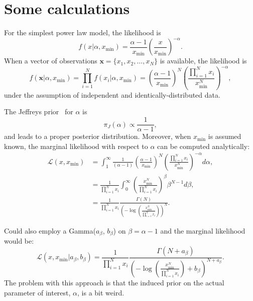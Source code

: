 \documentclass[a4paper, notitlepage, 10pt]{article}
\begin{document}
\section{Some calculations}
For the simplest power law model, the likelihood is
  $$ f(x | \alpha, x_{\min}) = \frac{\alpha - 1}{x_{\min} } \left(\frac{x}{ x_{\min} }\right)^{-\alpha}. $$
When a vector of observations $\boldsymbol x = \{ x_1, x_2, \ldots, x_N\}$ is available, the likelihood is
  $$ f(\boldsymbol x | \alpha,  x_{\min}) =   \prod_{i= 1}^N f(x_i | \alpha, x_{\min}) = \left( \frac{\alpha - 1}{x_{\min} } \right)^N \left(\frac{ \prod_{i= 1}^N x_i}{ x_{\min}^N }\right)^{-\alpha}, $$
under the assumption of independent and identically-distributed data.

The Jeffreys prior~\citep{Jeffreys1946} for $\alpha$ is 
$$ \pi_J(\alpha) \propto \frac{1}{\alpha - 1},$$
and leads to a proper posterior distribution.
Moreover, when $x_{\min}$ is assumed known, the marginal likelihood with respect to $\alpha$ can be computed analytically:
\begin{align*}
\mathcal{L}(x, x_{\min}) &= \int_{1}^\infty \frac{1}{(\alpha - 1)} \left( \frac{\alpha - 1}{x_{\min} } \right)^N \left(\frac{ \prod_{i= 1}^N x_i}{ x_{\min}^N }\right)^{-\alpha} d\alpha, \\
&= \frac{1}{\prod_{i= 1}^N x_i}\int_{0}^\infty   \left(\frac{x_{\min}^N}{\prod_{i= 1}^N x_i }\right)^\beta \beta^{N-1} d\beta,\\
&= \frac{1}{\prod_{i= 1}^N x_i} \frac{\Gamma(N)}{\left( -\log \left(\frac{x_{\min}^N}{\prod_{i= 1}^N x_i }\right) \right)^N}.
\end{align*}

Could also employ a Gamma($a_\beta$, $b_\beta$) on $\beta = \alpha - 1$ and the marginal likelihood would be:
\begin{equation}
\mathcal{L}(x, x_{\min} | a_\beta, b_\beta) = \frac{1}{\prod_{i= 1}^N x_i} \frac{\Gamma(N + a_\beta)}{\left( -\log \left(\frac{x_{\min}^N}{\prod_{i= 1}^N x_i }\right) + b_\beta \right)^{N + a_\beta}}.
\end{equation}
The problem with this approach is that the induced prior on the actual parameter of interest, $\alpha$, is a bit weird.
\end{document}
